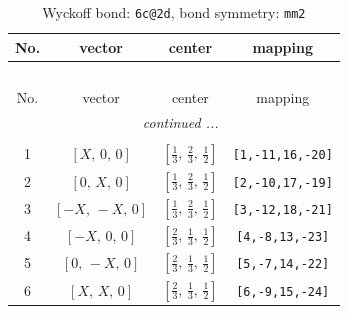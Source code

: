 \documentclass[fleqn,8pt]{jsarticle}
\begin{document}
\begin{longtable}{cccc}
\caption{Wyckoff bond: {\tt 6c@2d}, bond symmetry: {\tt mm2}}
 \\
 \hline \hline
No. & vector & center & mapping \\ \hline \endfirsthead

\multicolumn{3}{l}{\tablename\ \thetable{}} \\
 \hline \hline
No. & vector & center & mapping \\ \hline \endhead

 \hline \hline
\multicolumn{3}{r}{\footnotesize\it continued ...} \\ \endfoot

 \hline \hline
\multicolumn{3}{r}{} \\ \endlastfoot

1 & $\left[ X,\, 0,\, 0 \right]$ & $\left[ \frac{1}{3},\, \frac{2}{3},\, \frac{1}{2} \right]$ & {\tt [1,-11,16,-20]} \\ \hline
2 & $\left[ 0,\, X,\, 0 \right]$ & $\left[ \frac{1}{3},\, \frac{2}{3},\, \frac{1}{2} \right]$ & {\tt [2,-10,17,-19]} \\ \hline
3 & $\left[ - X,\, - X,\, 0 \right]$ & $\left[ \frac{1}{3},\, \frac{2}{3},\, \frac{1}{2} \right]$ & {\tt [3,-12,18,-21]} \\ \hline
4 & $\left[ - X,\, 0,\, 0 \right]$ & $\left[ \frac{2}{3},\, \frac{1}{3},\, \frac{1}{2} \right]$ & {\tt [4,-8,13,-23]} \\ \hline
5 & $\left[ 0,\, - X,\, 0 \right]$ & $\left[ \frac{2}{3},\, \frac{1}{3},\, \frac{1}{2} \right]$ & {\tt [5,-7,14,-22]} \\ \hline
6 & $\left[ X,\, X,\, 0 \right]$ & $\left[ \frac{2}{3},\, \frac{1}{3},\, \frac{1}{2} \right]$ & {\tt [6,-9,15,-24]} \\
\end{longtable}
\renewcommand{\arraystretch}{1.2}
\end{document}
